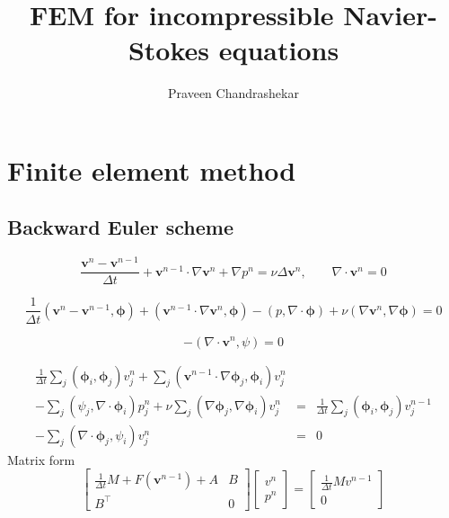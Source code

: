 \documentclass[12pt, oneside]{article}   	%
\title{FEM for incompressible Navier-Stokes equations}
\author{Praveen Chandrashekar}
\newcommand{\vel}{\bm{v}}
\newcommand{\dt}{\Delta t}
\newcommand{\idt}{\frac{1}{\dt}}
\newcommand{\vtest}{\bm{\phi}}
\newcommand{\ptest}{\psi}
\newcommand{\ip}[1]{\left( #1 \right)}
\begin{document}
\maketitle

\section{Finite element method}

\subsection{Backward Euler scheme}
\[
\frac{\vel^n - \vel^{n-1}}{\dt} + \vel^{n-1} \cdot \nabla \vel^{n} + \nabla p^n = \nu \Delta \vel^n, \qquad \nabla \cdot \vel^n = 0
\]

\[
\idt \ip{\vel^n - \vel^{n-1}, \vtest} + \ip{\vel^{n-1} \cdot \nabla \vel^{n}, \vtest} - \ip{p, \nabla\cdot\vtest} + \nu \ip{\nabla\vel^n, \nabla\vtest} = 0
\]

\[
- \ip{\nabla \cdot \vel^n, \ptest} = 0
\]

\begin{eqnarray*}
\idt \sum_j \ip{\vtest_i, \vtest_j} v_j^n  + \sum_j \ip{\vel^{n-1} \cdot \nabla \vtest_j, \vtest_i} v_j^n &&\\
- \sum_j \ip{\psi_j, \nabla\cdot\vtest_i} p_j^n + \nu \sum_j \ip{\nabla\vtest_j, \nabla\vtest_i} v_j^n &=& \idt \sum_j \ip{\vtest_i, \vtest_j} v_j^{n-1} \\
 - \sum_j \ip{\nabla \cdot \vtest_j, \ptest_i} v_j^n &=& 0
\end{eqnarray*}
Matrix form
\[
\begin{bmatrix}
\idt M + F(\vel^{n-1}) + A & B \\
B^\top & 0 \end{bmatrix}
\begin{bmatrix}
v^n \\ p^n \end{bmatrix} = \begin{bmatrix}
\idt M v^{n-1} \\ 0 \end{bmatrix}
\]

\end{document}
